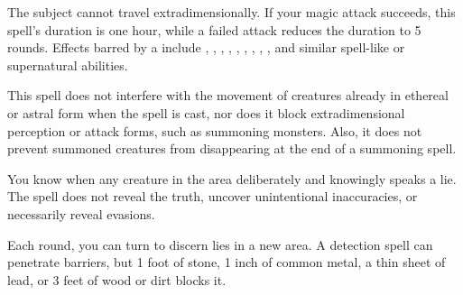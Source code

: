 \begin{spelleffect}
    The subject cannot travel extradimensionally. If your magic attack succeeds, this spell's duration is one hour, while a failed attack reduces the duration to 5 rounds. Effects barred by a  include , , , , , , , , , and similar spell-like or supernatural abilities.
\end{spelleffect}
\begin{spellnotes}
    This spell does not interfere with the movement of creatures already in ethereal or astral form when the spell is cast, nor does it block extradimensional perception or attack forms, such as summoning monsters. Also, it does not prevent summoned creatures from disappearing at the end of a summoning spell.
\end{spellnotes}

\begin{spelleffect}
    You know when any creature in the area deliberately and knowingly speaks a lie. The spell does not reveal the truth, uncover unintentional inaccuracies, or necessarily reveal evasions.
\end{spelleffect}
\begin{spellnotes}
    Each round, you can turn to discern lies in a new area. A detection spell can penetrate barriers, but 1 foot of stone, 1 inch of common metal, a thin sheet of lead, or 3 feet of wood or dirt blocks it.
\end{spellnotes}


